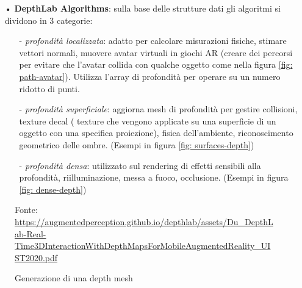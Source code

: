 \documentclass[crop=false, class=book]{standalone}
\begin{document}
\begin{itemize}
			\item[•] \textbf{DepthLab Algorithms}: sulla base delle strutture dati gli algoritmi si dividono in 3 categorie:
				\begin{itemize}
					\item[-] \emph{profondità localizzata}: adatto per calcolare misurazioni fisiche, stimare vettori normali, muovere avatar virtuali in giochi AR (creare dei percorsi per evitare che l'avatar collida con qualche oggetto come nella figura \vref{fig: path-avatar}). Utilizza l'array di profondità per operare su un numero ridotto di punti.
					\item[-] \emph{profondità superficiale}: aggiorna mesh di profondità per gestire collisioni, texture decal ( texture che vengono applicate su una superficie di un oggetto con una specifica proiezione), fisica dell'ambiente, riconoscimento geometrico delle ombre. (Esempi in figura \vref{fig: surfaces-depth})
					\item[-] \emph{profondità densa}: utilizzato sul rendering di effetti sensibili alla profondità, riilluminazione, messa a fuoco, occlusione. (Esempi in figura \vref{fig: dense-depth})
				\end{itemize}
			
		\end{itemize}
					
		\begin{figure}
				\centering
				{Fonte: \url{https://augmentedperception.github.io/depthlab/assets/Du_DepthLab-Real-Time3DInteractionWithDepthMapsForMobileAugmentedReality_UIST2020.pdf}}
				\caption{Generazione di una depth mesh }
				\label{fig: mesh-depth}
		\end{figure}
		
\end{document}
